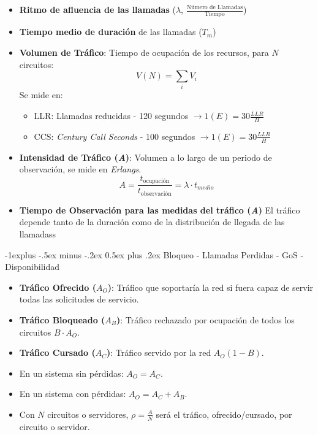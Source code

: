 \documentclass[10pt,portrait, twocolumn]{article}
\makeatletter
\renewcommand{\subsection}{\@startsection{subsection}{2}{0mm}%
                                {-1explus -.5ex minus -.2ex}%
                                {0.5ex plus .2ex}%
                                {\normalfont\normalsize\bfseries}}
\makeatother
\begin{document}
\begin{landscape}
\begin{multicols}{3}
\begin{itemize}
	\item \textbf{Ritmo de afluencia de las llamadas} ($\lambda$, $\frac{\mbox{Número de Llamadas}}{\mbox{Tiempo}}$)
	\item \textbf{Tiempo medio de duración} de las llamadas ($T_m$)
	\item \textbf{Volumen de Tráfico}: Tiempo de ocupación de los recursos, para $N$ circuitos:
		\begin{equation*}
			V(N) = \sum_i V_i
		\end{equation*}
		Se mide en:
		\begin{itemize}
			\item LLR: Llamadas reducidas - 120 segundos $\rightarrow 1(E) = 30 \frac{LLR}{H}$
			\item CCS: \textit{Century Call Seconds} - 100 segundos $\rightarrow 1(E) = 30 \frac{LLR}{H}$
		\end{itemize}
	\item \textbf{Intensidad de Tráfico (\textit{A})}: Volumen a lo largo de un periodo de observación, se mide en \textit{Erlangs}.
		\begin{equation*}
			A = \frac{t_{\mbox{ocupación}}}{t_{\mbox{observación}}} = \lambda \cdot t_{medio}
		\end{equation*}
	\item \textbf{Tiempo de Observación para las medidas del tráfico (\textit{A})} El tráfico depende tanto de la duración como de la distribución de llegada de las llamadass
\end{itemize}

\subsection{Bloqueo - Llamadas Perdidas - GoS - Disponibilidad}

\begin{itemize}
	\item \textbf{Tráfico Ofrecido ($A_O$)}: Tráfico que soportaría la red si fuera capaz de servir todas las solicitudes de servicio.
	\item \textbf{Tráfico Bloqueado ($A_B$)}: Tráfico rechazado por ocupación de todos los circuitos $B \cdot A_O$.
	\item \textbf{Tráfico Cursado ($A_C$)}: Tráfico servido por la red $A_O (1-B)$.
\end{itemize}

\begin{itemize}
	\item En un sistema sin pérdidas: $A_O = A_C$.
	\item En un sistema con pérdidas: $A_O = A_C + A_B$.
	\item Con $N$ circuitos o servidores, $\rho = \frac{A}{N}$ será el tráfico, ofrecido/cursado, por circuito o servidor.
\end{itemize}


\end{multicols}
\end{landscape}
\end{document}
